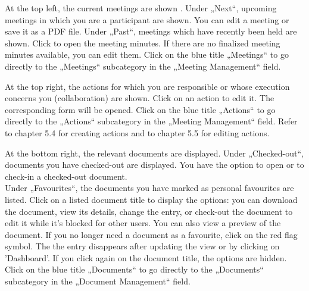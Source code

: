 At the top left, the current meetings are shown . Under „Next“, upcoming meetings in which you are a participant are shown. You can edit a meeting or save it as a PDF file. Under „Past“, meetings which have recently been held are shown. Click to open the meeting minutes. If there are no finalized meeting minutes available, you can edit them. Click on the blue title „Meetings“  to go directly to the „Meetings“ subcategory in the „Meeting Management“ field.

\vspace{\baselineskip}

At the top right, the actions  for which you are responsible or whose execution concerns you (collaboration) are shown. Click on an action to edit it. The corresponding form will be opened. Click on the blue title „Actions“  to go directly to the „Actions“ subcategory in the „Meeting Management“ field. Refer to chapter 5.4 for creating actions and to chapter 5.5 for editing actions.

\vspace{\baselineskip}

At the bottom right, the relevant documents  are displayed. Under „Checked-out“, documents you have checked-out are displayed. You have the option to open or to check-in a checked-out document. \\

Under „Favourites“, the documents you have marked as personal favourites are listed. Click on a listed document title to display the options: you can download the document, view its details, change the entry, or check-out the document to edit it while it's blocked for other users. You can also view a preview of the document. If you no longer need a document as a favourite, click on the red flag symbol. The the entry disappears after updating the view or by clicking on 'Dashboard'. If you click again on the document title, the options are hidden. Click on the blue title „Documents“  to go directly to the „Documents“ subcategory in the „Document Management“ field.

\vspace{\baselineskip}


